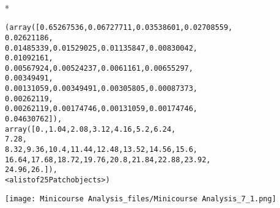 \documentclass[letterpaper,10pt,english]{/Users/stuartlynn/anaconda/lib/python2.7/site-packages/sphinx/texinputs/sphinxhowto}
\def\smaller{\fontsize{9.5pt}{9.5pt}\selectfont}
\newenvironment{InvisibleVerbatim}
        {\begin{mdframed}[leftmargin=0.1\linewidth,innerleftmargin=3pt,innerrightmargin=3pt, userdefinedwidth=1\linewidth, linewidth=0pt, linecolor=white, usetwoside=false]}
        {\end{mdframed}}
\begin{document}
    

        
        

            
                \makebox[0.1\linewidth]{\smaller\hfill\tt\color{nbframe-out-prompt}Out\hspace{4pt}{[}132{]}:\hspace{4pt}}\\*
                \vspace{-2.55\baselineskip}\begin{InvisibleVerbatim}
                \vspace{-0.5\baselineskip}
\begin{alltt}(array([ 0.65267536,  0.06727711,  0.03538601,  0.02708559,
0.02621186,
        0.01485339,  0.01529025,  0.01135847,  0.00830042,
0.01092161,
        0.00567924,  0.00524237,  0.0061161 ,  0.00655297,
0.00349491,
        0.00131059,  0.00349491,  0.00305805,  0.00087373,
0.00262119,
        0.00262119,  0.00174746,  0.00131059,  0.00174746,
0.04630762]),
 array([  0.  ,   1.04,   2.08,   3.12,   4.16,   5.2 ,   6.24,
7.28,
         8.32,   9.36,  10.4 ,  11.44,  12.48,  13.52,  14.56,  15.6 ,
        16.64,  17.68,  18.72,  19.76,  20.8 ,  21.84,  22.88,  23.92,
        24.96,  26.  ]),
 <a list of 25 Patch objects>)\end{alltt}

            \end{InvisibleVerbatim}
            
                \begin{InvisibleVerbatim}
                \vspace{-0.5\baselineskip}
    \begin{center}
    \texttt{[image: Minicourse Analysis\_files/Minicourse Analysis\_7\_1.png]}
    \par
    \end{center}
    
            \end{InvisibleVerbatim}
            
        
    


\end{document}
